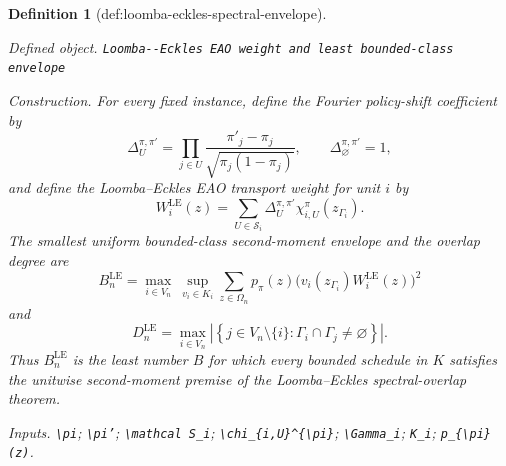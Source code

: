 \documentclass{article}
\newtheorem{definition}{Definition}
\begin{document}
\begin{definition}[def:loomba-eckles-spectral-envelope]\label{def:loomba-eckles-spectral-envelope}
\par\smallskip\noindent\emph{Defined object.} \texttt{Loomba-\allowbreak{}-\allowbreak{}Eckles EAO weight and least bounded-\allowbreak{}class envelope}
\par\smallskip\noindent\emph{Construction.} For every fixed instance, define the Fourier policy-shift coefficient by
\[
 \Delta_U^{\pi,\pi'}
 =\prod_{j\in U}\frac{\pi'_j-\pi_j}{\sqrt{\pi_j(1-\pi_j)}},
 \qquad \Delta_{\varnothing}^{\pi,\pi'}=1,
\]
and define the Loomba--Eckles EAO transport weight for unit \(i\) by
\[
 W_i^{\mathrm{LE}}(z)
 =\sum_{U\in\mathcal S_i}
   \Delta_U^{\pi,\pi'}\chi_{i,U}^{\pi}(z_{\Gamma_i}).
\]
The smallest uniform bounded-class second-moment envelope and the overlap degree are
\[
 B_n^{\mathrm{LE}}
 =\max_{i\in V_n}\ \sup_{v_i\in K_i}
   \sum_{z\in\Omega_n}p_{\pi}(z)
   \bigl(v_i(z_{\Gamma_i})W_i^{\mathrm{LE}}(z)\bigr)^2
\]
and
\[
 D_n^{\mathrm{LE}}
 =\max_{i\in V_n}
   \left|\left\{j\in V_n\setminus\{i\}:
   \Gamma_i\cap\Gamma_j\ne\varnothing\right\}\right|.
\]
Thus \(B_n^{\mathrm{LE}}\) is the least number \(B\) for which every bounded schedule in \(K\) satisfies the unitwise second-moment premise of the Loomba--Eckles spectral-overlap theorem.
\par\smallskip\noindent\emph{Inputs.} \texttt{\textbackslash{}\allowbreak{}pi}; \texttt{\textbackslash{}\allowbreak{}pi'}; \texttt{\textbackslash{}\allowbreak{}mathcal S\_\allowbreak{}i}; \texttt{\textbackslash{}\allowbreak{}chi\_\allowbreak{}\{i,\allowbreak{}U\}\allowbreak{}\textasciicircum{}\{\textbackslash{}\allowbreak{}pi\}\allowbreak{}}; \texttt{\textbackslash{}\allowbreak{}Gamma\_\allowbreak{}i}; \texttt{K\_\allowbreak{}i}; \texttt{p\_\allowbreak{}\{\textbackslash{}\allowbreak{}pi\}\allowbreak{}(z)}.
\end{definition}
\end{document}
